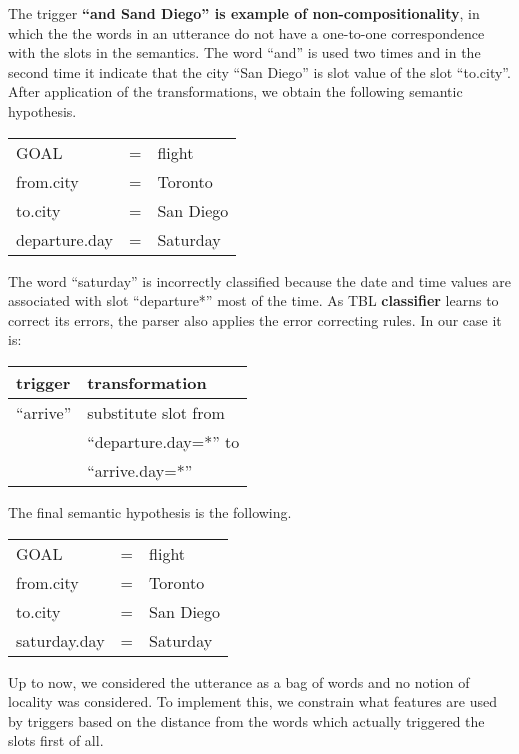 \documentclass[11pt]{article}
\begin{document}
The trigger \textbf{``and Sand Diego'' is example of non-compositionality}, in which the the words in an utterance do not have a one-to-one correspondence with the slots in the semantics. The word ``and'' is used two times and in the second time it indicate that the city ``San Diego'' is slot value of the slot ``to.city''. After application of the transformations, we obtain the following semantic hypothesis. 

\vspace{.25cm}
\begin{tabular}{lll}
  GOAL          & = & flight \\
  from.city     & = & Toronto \\
  to.city       & = & San Diego \\
  departure.day & = & Saturday \\
\end{tabular} 
\vspace{.25cm}

The word ``saturday'' is incorrectly classified because the date and time values are associated with slot ``departure*'' most of the time.  As TBL \textbf{classifier} learns to correct its errors, the parser also applies the error correcting rules. In our case it is:

\vspace{.25cm}
\begin{tabular}{ll}
  trigger & transformation \\
  \hline 
  ``arrive''            & substitute slot from\\
                        & ``departure.day=*'' to \\
                        & ``arrive.day=*'' \\
\end{tabular} 
\vspace{.25cm}

The final semantic hypothesis is the following.

\vspace{.25cm}
\begin{tabular}{lll}
  GOAL          & = & flight \\
  from.city     & = & Toronto \\
  to.city       & = & San Diego \\
  saturday.day & = & Saturday \\
\end{tabular} 
\vspace{.25cm}

Up to now, we considered the utterance as a bag of words and no notion of locality was considered. To implement this, we constrain what features are used by triggers based on the distance from the words which actually triggered the slots first of all.
\end{document}
